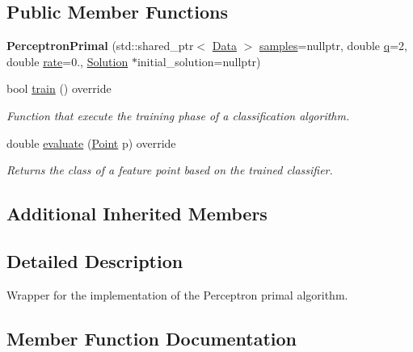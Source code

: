 \subsection*{Public Member Functions}
\begin{DoxyCompactItemize}
\item 
\mbox{\label{class_perceptron_primal_ae5440d7d451546d245a50c54ca4b424c}} 
{\bfseries Perceptron\+Primal} (std\+::shared\+\_\+ptr$<$ \hyperlink{class_data}{Data} $>$ \hyperlink{class_classifier_aad6a4fcea8f44339d7a6302f530852ca}{samples}=nullptr, double \hyperlink{class_primal_classifier_a746ad2ff93fb77d82ae389f90dbdc89e}{q}=2, double \hyperlink{class_classifier_af9867e5919742de1303dd971a9a1c19a}{rate}=0., \hyperlink{class_solution}{Solution} $\ast$initial\+\_\+solution=nullptr)
\item 
bool \hyperlink{class_perceptron_primal_aea1195af5503b2dfb086aacc92acfdc9}{train} () override
\begin{DoxyCompactList}\small\item\em Function that execute the training phase of a classification algorithm. \end{DoxyCompactList}\item 
double \hyperlink{class_perceptron_primal_a84b0d3d9627cc21fe9a7770d686e38ea}{evaluate} (\hyperlink{class_point}{Point} p) override
\begin{DoxyCompactList}\small\item\em Returns the class of a feature point based on the trained classifier. \end{DoxyCompactList}\end{DoxyCompactItemize}
\subsection*{Additional Inherited Members}


\subsection{Detailed Description}
Wrapper for the implementation of the Perceptron primal algorithm. 

\subsection{Member Function Documentation}
\mbox{\label{class_perceptron_primal_a84b0d3d9627cc21fe9a7770d686e38ea}} 
